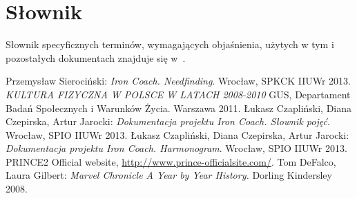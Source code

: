 \section{Słownik}
\noindent Słownik specyficznych terminów, wymagających objaśnienia, użytych w tym i pozostałych dokumentach znajduje się w~\cite{Sł}.
\begin{thebibliography}{99}
   Przemysław Sierociński: {\it Iron Coach. Needfinding}. Wrocław, SPKCK IIUWr 2013.
   {\it KULTURA FIZYCZNA W POLSCE W LATACH 2008-2010} GUS, Departament Badań Społecznych i Warunków Życia. Warszawa 2011.
   Łukasz Czapliński, Diana Czepirska, Artur Jarocki: {\it Dokumentacja projektu Iron Coach. Słownik pojęć}. Wrocław, SPIO IIUWr 2013.
   Łukasz Czapliński, Diana Czepirska, Artur Jarocki: {\it Dokumentacja projektu Iron Coach. Harmonogram}. Wrocław, SPIO IIUWr 2013.
   PRINCE2 Official website, \url{http://www.prince-officialsite.com/}.
   Tom DeFalco, Laura Gilbert: {\it Marvel Chronicle A Year by Year History.} Dorling Kindersley 2008. 
\end{thebibliography}

